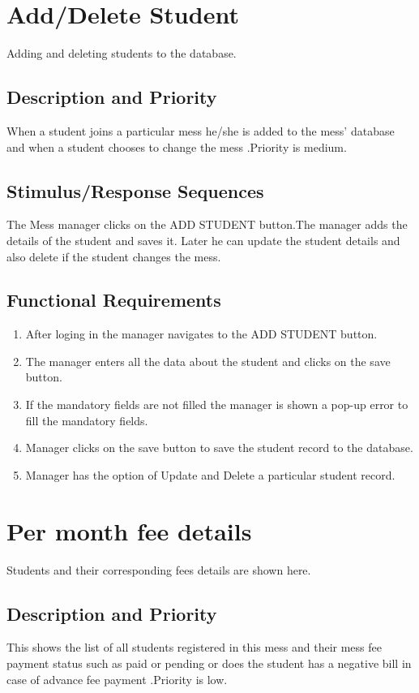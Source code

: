\documentclass{scrreprt}
\begin{document}
\section{Add/Delete Student}
Adding and deleting students to the database.


\subsection{Description and Priority}
When a student joins a particular mess he/she is added to the mess' database and when a student chooses to change the mess .Priority is medium.

\subsection{Stimulus/Response Sequences}
The Mess manager clicks on the ADD STUDENT button.The manager adds the details of the student and saves it. Later he can update the student details and also delete if the student changes the mess. 

\subsection{Functional Requirements}
\begin{enumerate}
\item After loging in the manager navigates to the ADD STUDENT  button.
\item The manager enters all the data about the student and clicks on the save button.
\item If the mandatory fields are not filled the manager is shown a pop-up error to fill the mandatory fields.
\item Manager clicks on the save button to save the student record to the database.
\item Manager has the option of Update and Delete a particular student record.
\end{enumerate}

\section{Per month fee details}
Students and their corresponding fees details are shown here.


\subsection{Description and Priority}
This shows the list of all students registered in this mess and their mess fee payment status such as paid or pending or does the student has a negative bill in case of advance fee payment .Priority is low.
\end{document}
